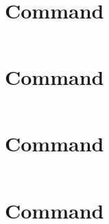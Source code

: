 \section{Command }
\label{asm:cmd_e}
\inputminted[fontsize=\small]{asm}{../ucode/command_e.asm}
\section{Command }
\label{asm:cmd_f}
\inputminted[fontsize=\small]{asm}{../ucode/command_f.asm}
\section{Command }
\label{asm:cmd_10}
\inputminted[fontsize=\small]{asm}{../ucode/command_10.asm}
\section{Command }
\label{asm:cmd_11}
\inputminted[fontsize=\small]{asm}{../ucode/command_11.asm}